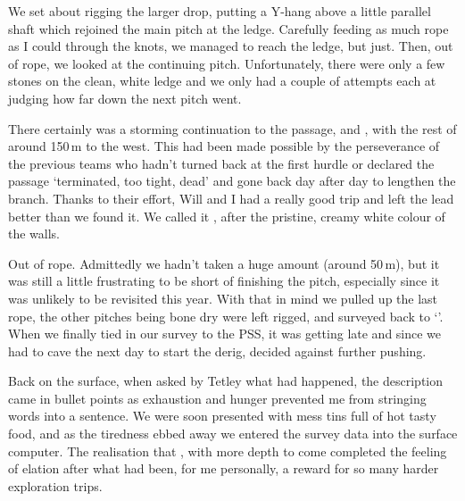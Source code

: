 We set about rigging the larger drop, putting a Y-hang above a little parallel shaft which rejoined the main pitch at the ledge. Carefully feeding as much rope as I could through the knots, we managed to reach the ledge, but just. Then, out of rope, we looked at the continuing pitch. Unfortunately, there were only a few stones on the clean, white ledge and we only had a couple of attempts each at judging how far down the next pitch went. 

There certainly was a storming continuation to the passage, and , with the rest of  around 150\,m to the west. This had been made possible by the perseverance of the previous teams who hadn't turned back at the first hurdle or declared the passage `terminated, too tight, dead' and gone back day after day to lengthen the branch.  Thanks to their effort, Will and I had  a really good trip and left the lead better than we found it. We called it , after the pristine, creamy white colour of the walls.

Out of rope. Admittedly we hadn't taken a huge amount (around 50\,m), but it was still a little frustrating to be short of finishing the pitch, especially since it was unlikely to be revisited this year.  With that in mind we pulled up the last rope, the other pitches being bone dry were left rigged, and surveyed back to `'. When we  finally tied in our survey to the PSS, it was getting late and since we had to cave the next day to start the derig, decided against further pushing. 

Back on the surface, when asked by Tetley what had happened, the description came in bullet points as exhaustion and hunger prevented me from stringing words into a sentence. We were soon presented with mess tins full of hot tasty food, and as the tiredness ebbed away we entered the survey data into the surface computer. The realisation that , with more depth to come completed the feeling of elation after what had been, for me personally, a reward for so many harder exploration trips.


